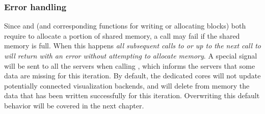 \subsubsection{Error handling}\label{sec:error}

Since  and  (and corresponding functions for writing or
allocating blocks) both require to allocate a portion of shared memory, a call may fail if the shared memory
is full. When this happens \emph{all subsequent calls to  or 
up to the next call to  will return with an error without attempting
to allocate memory}. A special signal will be sent to all the servers when
calling , which informs the servers that some data are missing
for this iteration. By default, the dedicated cores will not update potentially connected visualization backends,
and will delete from memory the data that has been written successfully for this iteration.
Overwriting this default behavior will be covered in the next chapter.

